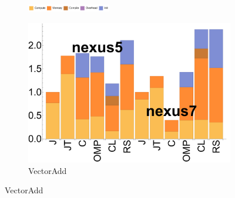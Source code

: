 % 
% 
% 


\begin{figure}[ht]

  \begin{subfigure}[b]{\textwidth}
          \centering
          \includegraphics[width=0.4\textwidth]{data/legend.pdf}
  \end{subfigure}

  \begin{subfigure}[b]{0.3\textwidth}
      \includegraphics[width=\textwidth]{data/bbattery_vectoradd.pdf}
      \caption{VectorAdd}\label{fig:b_vectoradd}
  \end{subfigure}


\end{figure}
